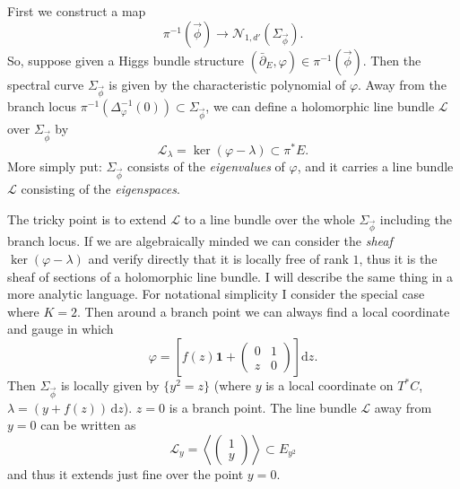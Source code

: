\documentclass[12pt,letterpaper,reqno]{article}
\numberwithin{equation}{section}
\newcommand{\cL}{\ensuremath{\mathcal L}}
\newcommand{\cN}{\ensuremath{\mathcal N}}
\newcommand\bid{{\mathbf 1}}
\newcommand{\de}{\mathrm{d}}
\newcommand{\ti}[1]{\textit{#1}}
\begin{document}
\begin{pf} First we construct a map
\begin{equation}
  \pi^{-1}(\vec\phi) \to \cN_{1,d'}(\Sigma_{\vec\phi}).
\end{equation}
So, suppose given a Higgs bundle structure
$(\bar\partial_E,\varphi) \in \pi^{-1}(\vec\phi)$.
Then the spectral
curve $\Sigma_{\vec\phi}$ is given by the characteristic polynomial
of $\varphi$. Away from the branch locus
 $\pi^{-1}(\Delta_\varphi^{-1}(0)) \subset \Sigma_{\vec\phi}$, we can
define a holomorphic line bundle $\cL$ over $\Sigma_{\vec\phi}$ by
\begin{equation}
 \cL_\lambda = \ker(\varphi - \lambda) \subset \pi^* E.
\end{equation}
More simply put:
$\Sigma_{\vec\phi}$ consists of the \ti{eigenvalues} of $\varphi$,
and it carries a line bundle $\cL$ consisting of the \ti{eigenspaces}.

The tricky point is to extend
$\cL$ to a line bundle over the whole $\Sigma_{\vec\phi}$
including the branch locus.
If we are algebraically minded we can consider the
\ti{sheaf} $\ker(\varphi-\lambda)$ and verify directly that it is
locally free of rank $1$, thus it is the sheaf of sections of a
holomorphic line bundle. I will describe the same thing in a more
analytic language. For notational simplicity I consider the special case
where $K=2$. Then around a branch point
we can always find a local coordinate and gauge in which
\begin{equation}
   \varphi = \left[f(z) \bid + \begin{pmatrix} 0 & 1 \\ z & 0 \end{pmatrix}\right] \de z.
\end{equation}
Then $\Sigma_{\vec\phi}$ is locally
given by $\{y^2 = z\}$ (where $y$ is a local coordinate on $T^*C$, $\lambda = (y+f(z)) \, \de z$). $z = 0$ is a branch point.
The line bundle $\cL$ away from $y=0$ can be written as
\begin{equation}
  \cL_y = \left\langle   \begin{pmatrix} 1 \\ y  \end{pmatrix}
\right\rangle  \subset E_{y^2}
\end{equation}
and thus it extends just fine over the point $y=0$.


\end{pf}
\end{document}
